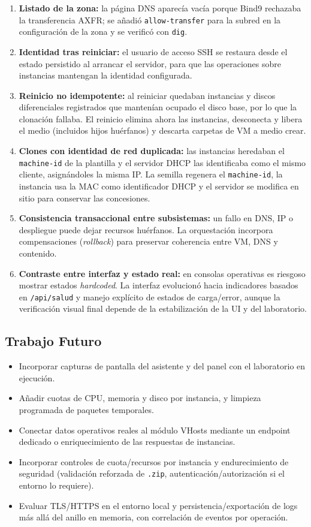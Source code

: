 \begin{enumerate}
    \item \textbf{Listado de la zona:} la página DNS aparecía vacía porque Bind9 rechazaba la transferencia AXFR; se añadió \texttt{allow-transfer} para la subred en la configuración de la zona y se verificó con \texttt{dig}.
    \item \textbf{Identidad tras reiniciar:} el usuario de acceso SSH se restaura desde el estado persistido al arrancar el servidor, para que las operaciones sobre instancias mantengan la identidad configurada.
    \item \textbf{Reinicio no idempotente:} al reiniciar quedaban instancias y discos diferenciales registrados que mantenían ocupado el disco base, por lo que la clonación fallaba. El reinicio elimina ahora las instancias, desconecta y libera el medio (incluidos hijos huérfanos) y descarta carpetas de VM a medio crear.
    \item \textbf{Clones con identidad de red duplicada:} las instancias heredaban el \texttt{machine-id} de la plantilla y el servidor DHCP las identificaba como el mismo cliente, asignándoles la misma IP. La semilla regenera el \texttt{machine-id}, la instancia usa la MAC como identificador DHCP y el servidor se modifica en sitio para conservar las concesiones.
    \item \textbf{Consistencia transaccional entre subsistemas:} un fallo en DNS, IP o despliegue puede dejar recursos huérfanos. La orquestación incorpora compensaciones (\textit{rollback}) para preservar coherencia entre VM, DNS y contenido.
    \item \textbf{Contraste entre interfaz y estado real:} en consolas operativas es riesgoso mostrar estados \emph{hardcoded}. La interfaz evolucionó hacia indicadores basados en \texttt{/api/salud} y manejo explícito de estados de carga/error, aunque la verificación visual final depende de la estabilización de la UI y del laboratorio.
\end{enumerate}

\subsection{Trabajo Futuro}
\begin{itemize}
    \item Incorporar capturas de pantalla del asistente y del panel con el laboratorio en ejecución.
    \item Añadir cuotas de CPU, memoria y disco por instancia, y limpieza programada de paquetes temporales.
    \item Conectar datos operativos reales al módulo VHosts mediante un endpoint dedicado o enriquecimiento de las respuestas de instancias.
    \item Incorporar controles de cuota/recursos por instancia y endurecimiento de seguridad (validación reforzada de \texttt{.zip}, autenticación/autorización si el entorno lo requiere).
    \item Evaluar TLS/HTTPS en el entorno local y persistencia/exportación de logs más allá del anillo en memoria, con correlación de eventos por operación.
\end{itemize}

